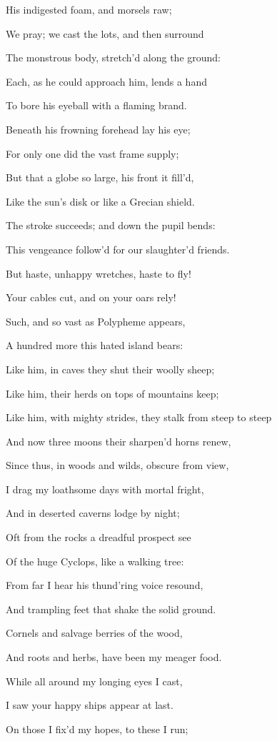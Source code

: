 His indigested foam, and morsels raw;

We pray; we cast the lots, and then surround

The monstrous body, stretch’d along the ground:

Each, as he could approach him, lends a hand

To bore his eyeball with a flaming brand.

Beneath his frowning forehead lay his eye;

For only one did the vast frame supply;

But that a globe so large, his front it fill’d,

Like the sun’s disk or like a Grecian shield.

The stroke succeeds; and down the pupil bends:

This vengeance follow’d for our slaughter’d friends.

But haste, unhappy wretches, haste to fly!

Your cables cut, and on your oars rely!

Such, and so vast as Polypheme appears,

A hundred more this hated island bears:

Like him, in caves they shut their woolly sheep;

Like him, their herds on tops of mountains keep;

Like him, with mighty strides, they stalk from steep to steep

And now three moons their sharpen’d horns renew,

Since thus, in woods and wilds, obscure from view,

I drag my loathsome days with mortal fright,

And in deserted caverns lodge by night;

Oft from the rocks a dreadful prospect see

Of the huge Cyclops, like a walking tree:

From far I hear his thund’ring voice resound,

And trampling feet that shake the solid ground.

Cornels and salvage berries of the wood,

And roots and herbs, have been my meager food.

While all around my longing eyes I cast,

I saw your happy ships appear at last.

On those I fix’d my hopes, to these I run;

